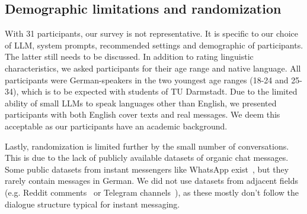 \subsection{Demographic limitations and randomization}
\label{sec:demographicLimitationsAndRandomization}
With 31 participants, our survey is not representative. It is specific to our choice of \gls{LLM}, system prompts, recommended settings and demographic of participants. The latter still needs to be discussed. In addition to rating linguistic characteristics, we asked participants for their age range and native language. All participants were German-speakers in the two youngest age ranges (18-24 and 25-34), which is to be expected with students of TU Darmstadt. Due to the limited ability of small \glspl{LLM} to speak languages other than English, we presented participants with both English cover texts and real messages. We deem this acceptable as our participants have an academic background.

Lastly, randomization is limited further by the small number of conversations. This is due to the lack of publicly available datasets of organic chat messages. Some public datasets from instant messengers like WhatsApp exist~\cite{ueberwasserWhatsSwitzerlandCorpusbased2017}, but they rarely contain messages in German. We did not use datasets from adjacent fields (e.g. Reddit comments~\cite{baumgartnerPushshiftRedditDataset2020} or Telegram channels~\cite{morgiaTGDatasetCollectingExploring2025}), as these mostly don't follow the dialogue structure typical for instant messaging.

